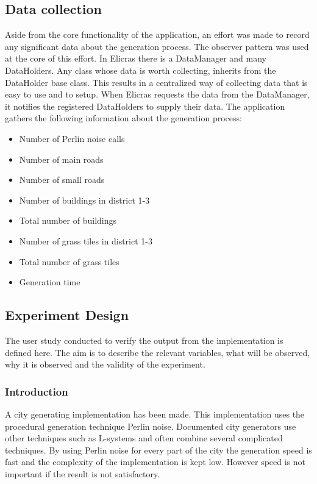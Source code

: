 	\subsection{Data collection}
	Aside from the core functionality of the application, an effort was made to record any significant data about the generation process. The observer pattern was used at the core of this effort. In Elicras there is a DataManager and many DataHolders. Any class whose data is worth collecting, inherits from the DataHolder base class. This results in a centralized way of collecting data that is easy to use and to setup. When Elicras requests the data from the DataManager, it notifies the registered DataHolders to supply their data. The application gathers the following information about the generation process:
		\begin{itemize}
			\item Number of Perlin noise calls
			\item Number of main roads
			\item Number of small roads
			\item Number of buildings in district 1-3
			\item Total number of buildings
			\item Number of grass tiles in district 1-3
			\item Total number of grass tiles
			\item Generation time
		\end{itemize}
	
	
	\subsection{Experiment Design}
	The user study conducted to verify the output from the implementation is defined here. The aim is to describe the relevant variables, what will be observed, why it is observed and the validity of the experiment.
		\subsubsection{Introduction}
		A city generating implementation has been made. This implementation uses the procedural generation technique Perlin noise. Documented city generators use other techniques such as L-systems \cite{ProceduralModeling6} and often combine several complicated techniques. By using Perlin noise for every part of the city the generation speed is fast and the complexity of the implementation is kept low. However speed is not important if the result is not satisfactory.
		
